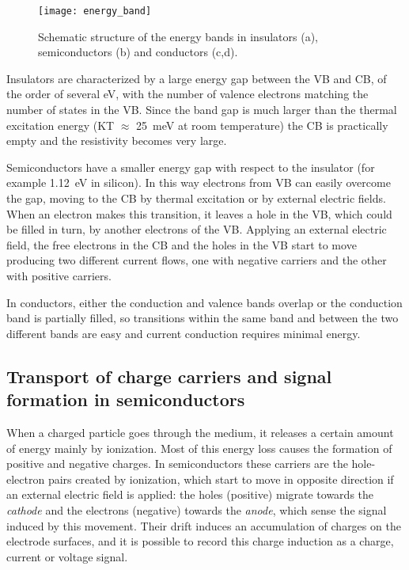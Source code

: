 \begin{figure}[h!]
\centering
\texttt{[image: energy\_band]}
\caption{Schematic structure of the energy bands in insulators (a), semiconductors (b) and conductors (c,d).}
\label{fig:energy_band}
\end{figure}

Insulators are characterized by a large energy gap between the VB and CB, of the order of several \unit{eV}, with the number of valence electrons matching the number of states in the VB. Since the band gap is much larger than the thermal excitation energy (KT $\approx$ \SI{25}{meV} at room temperature) the CB is practically empty and the resistivity becomes very large.

Semiconductors have a smaller energy gap with respect to the insulator (for example \SI{1.12}{eV} in silicon). In this way electrons from VB can easily overcome the gap, moving to the CB by thermal excitation or by external electric fields. When an electron makes this transition, it leaves a hole in the VB, which could be filled in turn, by another electrons of the VB. Applying an external electric field, the free electrons in the CB and the holes in the VB start to move producing two different current flows, one with negative carriers and the other with positive carriers.

In conductors, either the conduction and valence bands overlap or the conduction band is partially filled, so transitions within the same band and between the two different bands are easy and current conduction requires minimal energy.


\subsection{Transport of charge carriers and signal formation in semiconductors}

When a charged particle goes through the medium, it releases a certain amount of energy mainly by ionization. Most of this energy loss causes the formation of positive and negative charges. In semiconductors these carriers are the hole-electron pairs created by ionization, which start to move in opposite direction if an external electric field is applied: the holes (positive) migrate towards the \textit{cathode} and the electrons (negative) towards the \textit{anode}, which sense the signal induced by this movement. Their drift induces an accumulation of charges on the electrode surfaces, and it is possible to record this charge induction as a charge, current or voltage signal.\\

